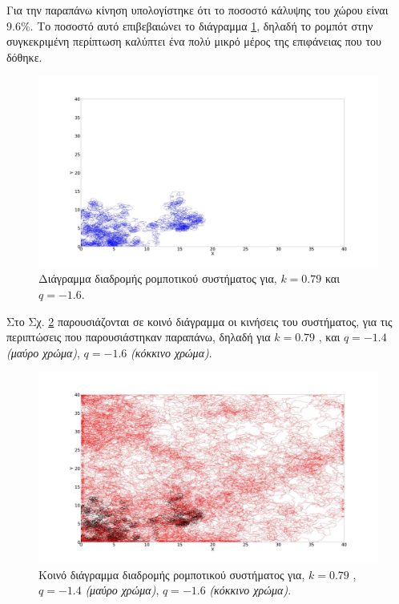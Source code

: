 Για την παραπάνω κίνηση υπολογίστηκε ότι το ποσοστό κάλυψης του χώρου είναι
$9.6 \% $. Το ποσοστό αυτό επιβεβαιώνει το διάγραμμα \ref{f:g73}, δηλαδή το ρομπότ στην συγκεκριμένη περίπτωση καλύπτει ένα πολύ μικρό μέρος της επιφάνειας που του δόθηκε.

\begin{figure}[ht]
	\centering
	\includegraphics[width=1\linewidth]{LateX images/log/q/g3-1.6}
	\caption{Διάγραμμα διαδρομής ρομποτικού συστήματος για, $k = 0.79$ και $q = -1.6$.}
	\label{f:g73}	
\end{figure}


Στο Σχ. \ref{f:g74} παρουσιάζονται σε κοινό διάγραμμα οι κινήσεις του συστήματος, για τις
περιπτώσεις που παρουσιάστηκαν παραπάνω, δηλαδή για $k=0.79$ , και $q = -1.4$ \emph{(μαύρο χρώμα)}, $q = -1.6$  \emph{(κόκκινο χρώμα)}.

\begin{figure}[ht]
	\centering
	\includegraphics[width=1\linewidth]{LateX images/log/q/g3}
	\caption{Κοινό διάγραμμα διαδρομής ρομποτικού συστήματος για, $k = 0.79$ , $q = -1.4$ \emph{(μαύρο χρώμα)}, $q = -1.6$  \emph{(κόκκινο χρώμα)}.}
	\label{f:g74}	
\end{figure}

